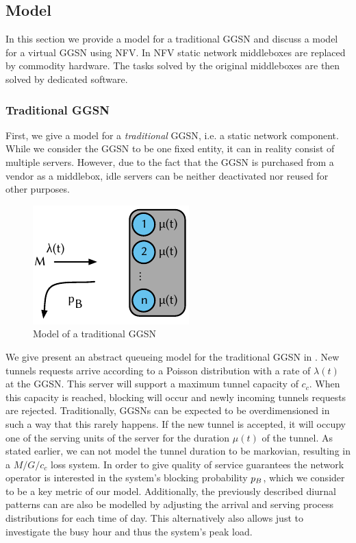 \subsection{Model}\label{sec:cloud:virtualized_network_functions:model}

In this section we provide a model for a traditional \gls{GGSN} and discuss a model for a virtual \gls{GGSN} using \gls{NFV}.
In \gls{NFV} \cite{Nfv2013} static network middleboxes are replaced by commodity hardware.
The tasks solved by the original middleboxes are then solved by dedicated software.

\subsubsection*{Traditional GGSN}\label{sec:cloud:virtualized_network_functions:model:traditional_ggsn}
First, we give a model for a \emph{traditional} \gls{GGSN}, i.e. a static network component.
While we consider the \gls{GGSN} to be one fixed entity, it can in reality consist of multiple servers.
However, due to the fact that the \gls{GGSN} is purchased from a vendor as a middlebox, idle servers can be neither deactivated nor reused for other purposes.

\begin{figure}
  \centering
  \includegraphics{cloud/virtualized_network_functions/model/figures/traditional_ggsn}
  \caption{Model of a traditional GGSN}
  \label{sec:cloud:virtualized_network_functions:model:traditional_ggsn:model}
\end{figure}

We give present an abstract queueing model for the traditional \gls{GGSN} in .
New tunnels requests arrive according to a Poisson distribution with a rate of \(\lambda(t)\) at the \gls{GGSN}.
This server will support a maximum tunnel capacity of \(c_c\).
When this capacity is reached, blocking will occur and newly incoming tunnels requests are rejected.
Traditionally, \glspl{GGSN} can be expected to be overdimensioned in such a way that this rarely happens.
If the new tunnel is accepted, it will occupy one of the serving units of the server for the duration \(\mu(t)\) of the tunnel.
As stated earlier, we can not model the tunnel duration to be markovian, resulting in a  \(M/G/c_c\) loss system.
In order to give quality of service guarantees the network operator is interested in the system's blocking probability \(p_B\), which we consider to be a key metric of our model.
Additionally, the previously described diurnal patterns can are also be modelled by adjusting the arrival and serving process distributions for each time of day.
This alternatively also allows just to investigate the busy hour and thus the system's peak load.

